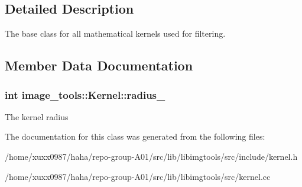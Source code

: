 \subsection{Detailed Description}
The base class for all mathematical kernels used for filtering. 

\subsection{Member Data Documentation}
\subsubsection[{\texorpdfstring{radius\+\_\+}{radius_}}]{\setlength{\rightskip}{0pt plus 5cm}int image\+\_\+tools\+::\+Kernel\+::radius\+\_\+\hspace{0.3cm}{\ttfamily [private]}}\hypertarget{classimage__tools_1_1Kernel_a75493a8e73d0217897d83da1ad30cc82}{}\label{classimage__tools_1_1Kernel_a75493a8e73d0217897d83da1ad30cc82}
The kernel radius 

The documentation for this class was generated from the following files\+:\begin{DoxyCompactItemize}
\item 
/home/xuxx0987/haha/repo-\/group-\/\+A01/src/lib/libimgtools/src/include/kernel.\+h\item 
/home/xuxx0987/haha/repo-\/group-\/\+A01/src/lib/libimgtools/src/kernel.\+cc\end{DoxyCompactItemize}
